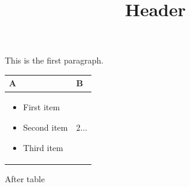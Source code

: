 \documentclass[11pt,a4paper]{article}
\title{Header}
\begin{document}
\maketitle

This is the first paragraph.

\begin{table}[h]
\begin{tabular}{|l|l|}
\hline
A & B \\ \hline
\begin{itemize} \item First item \item Second item \item Third item \end{itemize} & 2... \\ \hline
\end{tabular}
\end{table}

After table
\end{document}
